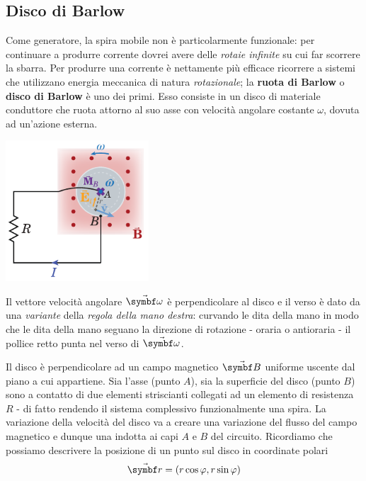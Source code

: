 \subsection{Disco di Barlow}
Come generatore, la spira mobile non è particolarmente funzionale: per continuare a produrre corrente dovrei avere delle \textit{rotaie infinite} su cui far scorrere la sbarra. Per produrre una corrente è nettamente più efficace ricorrere a sistemi che utilizzano energia meccanica di natura \textit{rotazionale}; la \textbf{ruota di Barlow} o \textbf{disco di Barlow} è uno dei primi. Esso consiste in un disco di materiale conduttore che ruota attorno al suo asse con velocità angolare costante $\omega$, dovuta ad un'azione esterna.
\begin{center}
	\includegraphics[width=0.4\textwidth]{images/chp11/chp11generatorediscodibarlow.pdf}
\end{center}
\begin{observe}
	Il vettore velocità angolare $\vba{\omega}$ è perpendicolare al disco e il verso è dato da una \textit{variante} della \textit{regola della mano destra}: curvando le dita della mano in modo che le dita della mano seguano la direzione di rotazione - oraria o antioraria - il pollice retto punta nel verso di $\vba{\omega}$.
\end{observe}
Il disco è perpendicolare ad un campo magnetico $\vba{B}$ uniforme uscente dal piano a cui appartiene. Sia l'asse (punto $A$), sia la superficie del disco (punto $B$) sono a contatto di due elementi striscianti collegati ad un elemento di resistenza $R$ - di fatto rendendo il sistema complessivo funzionalmente una spira.
La variazione della velocità del disco va a creare una variazione del flusso del campo magnetico e dunque una \ddp indotta ai capi $A$ e $B$ del circuito.
Ricordiamo che possiamo descrivere la posizione di un punto sul disco in coordinate polari\label{femdiscobarlow}
\begin{equation*}
	\vba{r}=(r\cos\phi,r\sin\phi)
\end{equation*}
